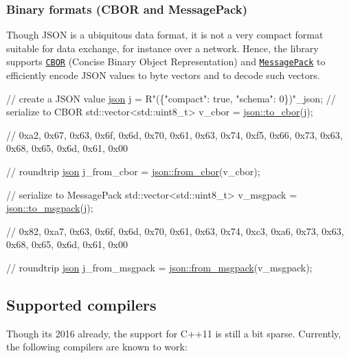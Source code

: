 \subsubsection*{Binary formats (C\+B\+OR and Message\+Pack)}

Though J\+S\+ON is a ubiquitous data format, it is not a very compact format suitable for data exchange, for instance over a network. Hence, the library supports \href{http://cbor.io}{\tt C\+B\+OR} (Concise Binary Object Representation) and \href{http://msgpack.org}{\tt Message\+Pack} to efficiently encode J\+S\+ON values to byte vectors and to decode such vectors.


\begin{DoxyCode}
\textcolor{comment}{// create a JSON value}
\hyperlink{classnlohmann_1_1basic__json}{json} j = R\textcolor{stringliteral}{"(\{"compact": true, "schema": 0\})"\_json;}
\textcolor{stringliteral}{}
\textcolor{stringliteral}{}\textcolor{comment}{// serialize to CBOR}
std::vector<std::uint8\_t> v\_cbor = \hyperlink{classnlohmann_1_1basic__json_a2566783e190dec524bf3445b322873b8}{json::to\_cbor}(j);

\textcolor{comment}{// 0xa2, 0x67, 0x63, 0x6f, 0x6d, 0x70, 0x61, 0x63, 0x74, 0xf5, 0x66, 0x73, 0x63, 0x68, 0x65, 0x6d, 0x61,
       0x00}

\textcolor{comment}{// roundtrip}
\hyperlink{classnlohmann_1_1basic__json}{json} j\_from\_cbor = \hyperlink{classnlohmann_1_1basic__json_aa9be366b887378bb10c0f1ab510c2f0c}{json::from\_cbor}(v\_cbor);

\textcolor{comment}{// serialize to MessagePack}
std::vector<std::uint8\_t> v\_msgpack = \hyperlink{classnlohmann_1_1basic__json_a09ca1dc273d226afe0ca83a9d7438d9c}{json::to\_msgpack}(j);

\textcolor{comment}{// 0x82, 0xa7, 0x63, 0x6f, 0x6d, 0x70, 0x61, 0x63, 0x74, 0xc3, 0xa6, 0x73, 0x63, 0x68, 0x65, 0x6d, 0x61,
       0x00}

\textcolor{comment}{// roundtrip}
\hyperlink{classnlohmann_1_1basic__json}{json} j\_from\_msgpack = \hyperlink{classnlohmann_1_1basic__json_aab804530006701b136ef9a0bc961434b}{json::from\_msgpack}(v\_msgpack);
\end{DoxyCode}


\subsection*{Supported compilers}

Though it\textquotesingle{}s 2016 already, the support for C++11 is still a bit sparse. Currently, the following compilers are known to work\+:


